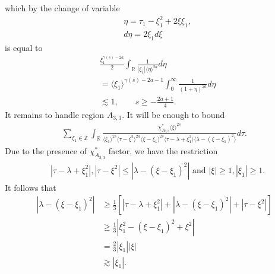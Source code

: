 \documentclass[12pt,reqno]{amsart}
\numberwithin{equation}{section}  %
\numberwithin{figure}{section}
\newcommand{\rr}{\mathbb{R}}
\newcommand{\zz}{\mathbb{Z}}
\theoremstyle{plain}
\theoremstyle{definition}
\theoremstyle{remark}
\begin{document}
which by the change of variable
%
%
\begin{equation*}
\begin{split}
  & \eta = \tau_{1} - \xi_{1}^{2} + 2 \xi \xi_{1},
  \\
  & d \eta = 2 \xi_{1} d \xi
\end{split}
\end{equation*}
%
%
is equal to
%
%
\begin{equation*}
\begin{split}
  & \frac{\xi_{1}^{\gamma(s) -2a}}{2}  \int_{\rr} 
  \frac{1}{| \xi_{1} |\langle \eta \rangle ^{2a} }d \eta
  \\
  & = \langle \xi_{1} \rangle ^{\gamma(s) -2a -1} \int_{0}^{\infty} \frac{1}{(1 + \eta
  )^{2a}}d \eta
  \\
  & \lesssim 1, \qquad s \ge -\frac{2a+1}{4}.
\end{split}
\end{equation*}
It remains to handle region $A_{3,3}$. It will be enough to bound
%
%
\begin{equation}
  \label{region-A-2-3-star-split}
\begin{split}
   \sum_{\xi_{1} \in \zz} \int_{\rr} \frac{\chi^{*}_{A_{3,3}}
    \langle \xi \rangle ^{2s}
    }{ \langle \xi_{1} \rangle^{2s} \langle  \tau  - \xi^{2}
    \rangle ^{2a}  \langle
\xi-\xi_{1} \rangle ^{2s}  \langle  \tau - \lambda+\xi_{1}^{2}
\rangle \langle   \lambda  -(\xi - \xi_{1})^{2}
\rangle } d \tau.
\end{split}
\end{equation}
%
Due to the presence of $\chi^{*}_{A_{3,3}}$ factor, we have the restriction
%
%
\begin{equation*}
\begin{split}
& |\tau - \lambda +\xi_{1}^2|, | \tau - \xi^{2} | \le |  \lambda -
(\xi - \xi_{1})^{2} | \text{ and }  |\xi| \ge 1, |\xi_1| \ge 1.
\end{split}
\end{equation*}
%
It follows that
\begin{equation}
  \label{smoothing-2-3-case-6}
\begin{split}
  | \lambda - (\xi - \xi_{1})^{2} |
  & \ge \frac{1}{3}\left[ | \tau - \lambda + \xi_{1}^{2} | + | \lambda - (\xi - \xi_{1})^{2}
  | + | \tau - \xi^{2} | \right]
  \\
  & \ge \frac{1}{3} |  \xi_{1}^{2} - (\xi - \xi_{1})^{2} + \xi^{2} |
  \\
  & = \frac{2}{3} | \xi_{1} | | \xi |
  \\
  & \gtrsim | \xi_{1} |.
\end{split}
\end{equation}
\end{document}

